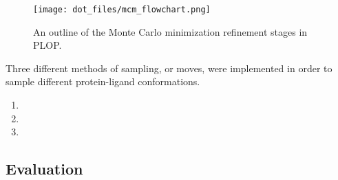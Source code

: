\begin{figure}[hp]
\centering
\texttt{[image: dot\_files/mcm\_flowchart.png]}
\caption{An outline of the Monte Carlo minimization refinement stages in PLOP.}
\label{figure:mcm_flowchart}
\end{figure}

Three different methods of sampling, or moves, were implemented in order to sample different protein-ligand conformations.
\begin{enumerate}
\item 
\item 
\item 
\end{enumerate}

\subsection{Evaluation}
\label{subsection:p450/evaluation}

